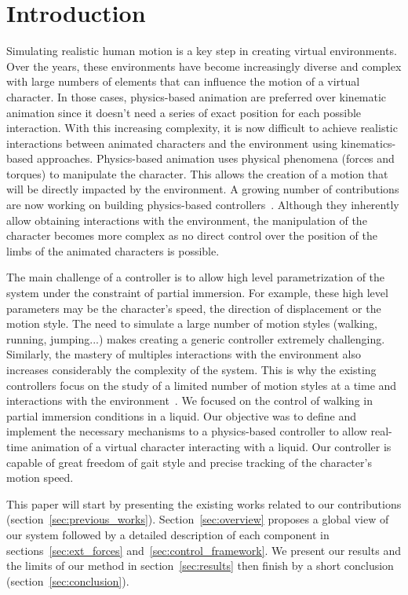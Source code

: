 \documentclass[conference]{acmsiggraph}
\begin{document}
\keywordlist

\copyrightspace

\section{Introduction}

Simulating realistic human motion is a key step in creating virtual environments. Over the years, these environments have become increasingly diverse and complex with large numbers of elements that can influence the motion of a virtual character. In those cases, physics-based animation are preferred over kinematic animation since it doesn't need a series of exact position for each possible interaction. With this increasing complexity, it is now difficult to achieve realistic interactions between animated characters and the environment using kinematics-based approaches. Physics-based animation uses physical phenomena (forces and torques) to manipulate the character. This allows the creation of a motion that will be directly impacted by the environment. A growing number of contributions are now working on building physics-based controllers~\cite{geijtenbeek2012interactive}. Although they inherently allow obtaining interactions with the environment, the manipulation of the character becomes more complex as no direct control over the position of the limbs of the animated characters is possible.

The main challenge of a controller is to allow high level parametrization of the system under the constraint of partial immersion. For example, these high level parameters may be the character's speed, the direction of displacement or the motion style. The need to simulate a large number of motion styles (walking, running, jumping...) makes creating a generic controller extremely challenging. Similarly, the mastery of multiples interactions with the environment also increases considerably the complexity of the system. This is why the existing controllers focus on the study of a limited number of motion styles at a time and interactions with the environment~\cite{geijtenbeek2012interactive}. We focused on the control of walking in partial immersion conditions in a liquid. Our objective was to define and implement the necessary mechanisms to a physics-based controller to allow real-time animation of a virtual character interacting with a liquid. Our controller is capable of great freedom of gait style and precise tracking of the character's motion speed.

This paper will start by presenting the existing works related to our contributions (section~\ref{sec:previous_works}). Section~\ref{sec:overview} proposes a global view of our system followed by a detailed description of each component in sections~\ref{sec:ext_forces} and~\ref{sec:control_framework}. We present our results and the limits of our method in section~\ref{sec:results} then finish by a short conclusion (section~\ref{sec:conclusion}).
 
\end{document}
